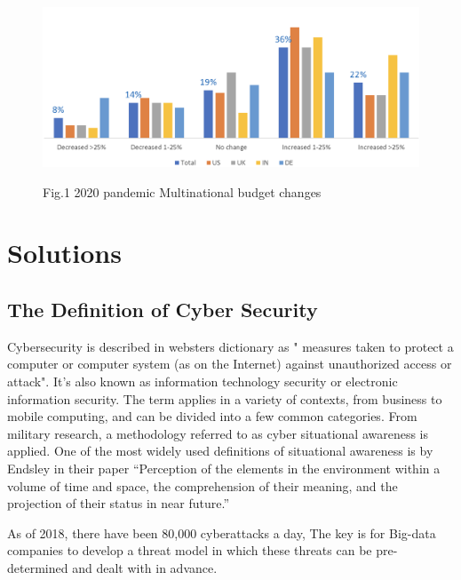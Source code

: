 \documentclass[journal]{IEEEtran}
\begin{document}
\begin{figure}[h]
\centering
{\includegraphics[width=.45\textwidth]{LiteratureReviewAttackForecasting/Other/photos/responsetoPandemic.png}}

\caption{ Fig.1 2020 pandemic Multinational  budget changes }

\end{figure}





\section{Solutions}


\subsection{The Definition of Cyber Security}

Cybersecurity is described in websters dictionary as " measures taken to protect a computer or computer system (as on the Internet) against unauthorized access or attack".  It's also known as information technology security or electronic information security. The term applies in a variety of contexts, from business to mobile computing, and can be divided into a few common categories. From military research, a methodology referred to as cyber situational awareness is applied. One of the most widely used definitions of situational awareness is by Endsley  in their paper \cite{situationalAwareness} “Perception
of the elements in the environment within a volume of time and
space, the comprehension of their meaning, and the projection
of their status in near future.” 




\label{subsec:cyberattacks}
As of 2018, there have been 80,000 cyberattacks a day, The key is for Big-data companies to develop a threat model in which these threats can be pre-determined and dealt with in advance.




\end{document}
